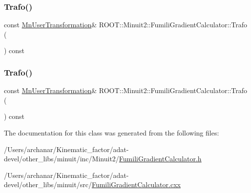 \mbox{\label{classROOT_1_1Minuit2_1_1FumiliGradientCalculator_a60672fa936f927ab01a7eb9ede6cb6e0}} 
\subsubsection{\texorpdfstring{Trafo()}{Trafo()}\hspace{0.1cm}{\footnotesize\ttfamily [2/3]}}
{\footnotesize\ttfamily const \mbox{\hyperlink{classROOT_1_1Minuit2_1_1MnUserTransformation}{Mn\+User\+Transformation}}\& R\+O\+O\+T\+::\+Minuit2\+::\+Fumili\+Gradient\+Calculator\+::\+Trafo (\begin{DoxyParamCaption}{ }\end{DoxyParamCaption}) const\hspace{0.3cm}{\ttfamily [inline]}}

\mbox{\label{classROOT_1_1Minuit2_1_1FumiliGradientCalculator_a60672fa936f927ab01a7eb9ede6cb6e0}} 
\subsubsection{\texorpdfstring{Trafo()}{Trafo()}\hspace{0.1cm}{\footnotesize\ttfamily [3/3]}}
{\footnotesize\ttfamily const \mbox{\hyperlink{classROOT_1_1Minuit2_1_1MnUserTransformation}{Mn\+User\+Transformation}}\& R\+O\+O\+T\+::\+Minuit2\+::\+Fumili\+Gradient\+Calculator\+::\+Trafo (\begin{DoxyParamCaption}{ }\end{DoxyParamCaption}) const\hspace{0.3cm}{\ttfamily [inline]}}



The documentation for this class was generated from the following files\+:\begin{DoxyCompactItemize}
\item 
/\+Users/archanar/\+Kinematic\+\_\+factor/adat-\/devel/other\+\_\+libs/minuit/inc/\+Minuit2/\mbox{\hyperlink{adat-devel_2other__libs_2minuit_2inc_2Minuit2_2FumiliGradientCalculator_8h}{Fumili\+Gradient\+Calculator.\+h}}\item 
/\+Users/archanar/\+Kinematic\+\_\+factor/adat-\/devel/other\+\_\+libs/minuit/src/\mbox{\hyperlink{adat-devel_2other__libs_2minuit_2src_2FumiliGradientCalculator_8cxx}{Fumili\+Gradient\+Calculator.\+cxx}}\end{DoxyCompactItemize}
